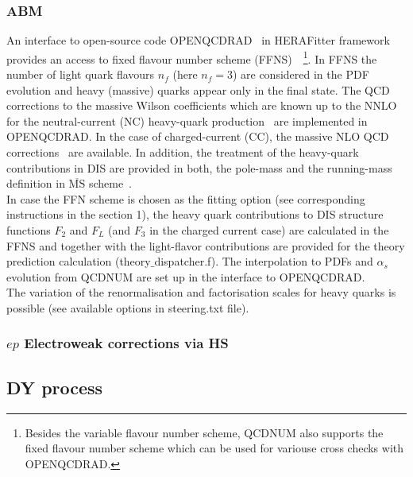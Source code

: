\documentclass[11pt,a4paper]{article}
\begin{document}
\subsubsection{ABM}
An interface to open-source code OPENQCDRAD~\cite{openqcdrad:page} in HERAFitter framework 
provides an access to 
fixed flavour number scheme (FFNS)~\cite{Laenen:1992,Laenen:1993,Riem:1995}~\footnote{Besides 
the variable flavour number 
scheme, QCDNUM also supports the fixed flavour number scheme which can be used for variouse 
cross checks with OPENQCDRAD.}. In FFNS the number of light quark 
flavours $n_{f}$ (here $n_{f}=3$) are considered in the PDF evolution and heavy (massive) 
quarks appear only in the final state. 
The QCD corrections to the massive Wilson coefficients which are known up to the NNLO
for the neutral-current (NC) heavy-quark production~\cite{} are implemented in OPENQCDRAD.
In the case of charged-current (CC), the massive NLO QCD corrections~\cite{} are available.
In addition, the treatment of the heavy-quark contributions in DIS are provided 
in both, the pole-mass and the running-mass definition in $\overline{\text{MS}}$ 
scheme~\cite{Alekhin:runm}. \\
In case the FFN scheme is chosen as the fitting option (see corresponding instructions in the section 1),
the heavy quark contributions to DIS structure functions $F_2$ and $F_L$ (and $F_3$ in the charged 
current case) are calculated in the FFNS and together with the light-flavor contributions are 
provided for the theory prediction calculation (theory$\_$dispatcher.f).
The interpolation to PDFs and $\alpha_s$ evolution from QCDNUM are set up in the interface to OPENQCDRAD. \\
The variation of the renormalisation and factorisation scales for heavy quarks is 
possible (see available options in steering.txt file).
%
%       
\subsubsection{$ep$ Electroweak corrections via HS}
\subsection{DY process}
\end{document}

